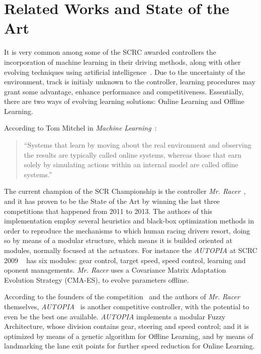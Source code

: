 \section{\textbf{Related Works and State of the Art}} \label{sec:Related}
	
	It is very common among some of the SCRC awarded controllers the incorporation of machine learning in their driving methods, along with other evolving techniques using artificial intelligence~\cite{2009}. Due to the uncertainty of the environment, track is initialy unknown to the controller, learning procedures may grant some advantage, enhance performance and competitiveness. Essentially, there are two ways of evolving learning solutions: Online Learning and Offline Learning.

	According to Tom Mitchel in \emph{Machine Learning}~\cite{Mitcchel:ML}:

	\begin{quotation} \itshape

		``Systems that learn by moving about the real environment and observing the results are typically called online systems, whereas those that earn solely by simulating actions within an internal model are called ofline systems.''
	
	\end{quotation}

		The current champion of the SCR Championship is the controller \emph{Mr. Racer}~\cite{MrRacer}, and it has proven to be the State of the Art by winning the last three competitions that happened from 2011 to 2013. The authors of this implementation employ several heuristics and black-box optimization methods in order to reproduce the mechanisms to which human racing drivers resort, doing so by means of a modular structure, which means it is builded oriented at modules, normally focused at the actuators. For instance the \emph{AUTOPIA} at SCRC 2009 ~\cite{AUTOPIA2009} has six modules: gear control, target speed, speed control, learning and oponent managements. \emph{Mr. Racer} uses a Covariance Matrix Adaptation Evolution Strategy (CMA-ES), to evolve parameters offline.
	
	According to the founders of the competition~\cite{SCRC} and the authors of \emph{Mr. Racer} themselves, \emph{AUTOPIA}~\cite{AUTOPIA} is another competitive controller, with the potential to even be the best one available. \emph{AUTOPIA} implements a modular Fuzzy Architecture, whose division contains gear, steering and speed control; and it is optimized by means of a genetic algorithm for Offline Learning, and by means of landmarking the lane exit points for further speed reduction for Online Learning.

